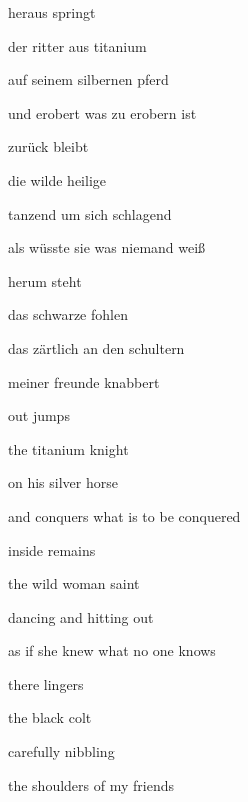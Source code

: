 





\bigskip



\bigskip

heraus springt

der ritter aus titanium

auf seinem silbernen pferd


\bigskip

und erobert was zu erobern ist


\bigskip

zurück bleibt

die wilde heilige

tanzend um sich schlagend


\bigskip

als wüsste sie was niemand weiß


\bigskip

herum steht

das schwarze fohlen

das zärtlich an den schultern


\bigskip

meiner freunde knabbert


\bigskip


\bigskip



\bigskip

out jumps

the titanium knight

on his silver horse


\bigskip

and conquers what is to be conquered


\bigskip

inside remains

the wild woman saint

dancing and hitting out 


\bigskip

as if she knew what no one knows


\bigskip

there lingers

the black colt

carefully nibbling 


\bigskip

the shoulders of my friends


\bigskip

